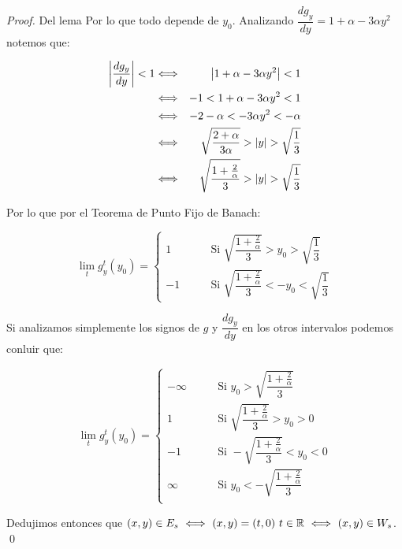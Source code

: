 \begin{example}
\begin{proof}{Del lema}
		Por lo que todo depende de $y_0$. Analizando $\dfrac{d g_y}{dy} = 1 + \alpha - 3\alpha y^2$ notemos que:
		
		\begin{equation*}
		\begin{aligned}
		\left\lvert\dfrac{d g_y}{dy}\right\rvert < 1  & \Longleftrightarrow & \left\lvert1 + \alpha - 3\alpha y^2\right\rvert < 1 \\
		& \Longleftrightarrow & -1 < 1 + \alpha - 3\alpha y^2 < 1 \\
		& \Longleftrightarrow &  -2 - \alpha < -3 \alpha y^2 < -\alpha \\
		& \Longleftrightarrow &  \sqrt{\dfrac{2 + \alpha}{3\alpha}} > \left\lvert y\right\rvert > \sqrt{\dfrac{1}{3}} \\
		& \Longleftrightarrow &  \sqrt{\dfrac{1 + \frac{2}{\alpha}}{3}} > \left\lvert y\right\rvert > \sqrt{\dfrac{1}{3}}
		\end{aligned}
		\end{equation*}
		
		Por lo que por el Teorema de Punto Fijo de Banach:
		
		\begin{equation*}
		\lim\limits_t g_y^t(y_0) = \left\lbrace \begin{aligned}
		1 & \qquad \text{Si } \sqrt{\dfrac{1 + \frac{2}{\alpha}}{3}} > y_0 > \sqrt{\dfrac{1}{3}} \\
		-1 & \qquad \text{Si } \sqrt{\dfrac{1 + \frac{2}{\alpha}}{3}} < -y_0 < \sqrt{\dfrac{1}{3}}
		\end{aligned} \right.
		\end{equation*}
		
		Si analizamos simplemente los signos de $g$ y $\dfrac{d g_y}{dy}$ en los otros intervalos podemos conluir que:
		
		\begin{equation*}
		\lim\limits_t g_y^t(y_0) = \left\lbrace \begin{aligned}
		-\infty & \qquad \text{Si } y_0 >  \sqrt{\dfrac{1 + \frac{2}{\alpha}}{3}} \\
		1 & \qquad \text{Si } \sqrt{\dfrac{1 + \frac{2}{\alpha}}{3}} > y_0 > 0 \\
		-1 & \qquad \text{Si } -\sqrt{\dfrac{1 + \frac{2}{\alpha}}{3}} < y_0 < 0 \\
		\infty & \qquad \text{Si } y_0 < -\sqrt{\dfrac{1 + \frac{2}{\alpha}}{3}} \\
		\end{aligned} \right.
		\end{equation*}
		
		Dedujimos entonces que $(x,y) \in E_s \ \Longleftrightarrow \ (x,y) = (t,0) \ t \in \R \ \Longleftrightarrow \ (x,y) \in W_s$. \qed
		
	\end{proof}
	
\end{example}

